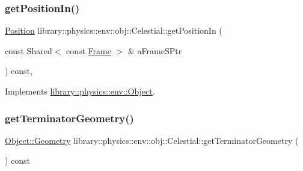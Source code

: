 \mbox{\label{classlibrary_1_1physics_1_1env_1_1obj_1_1_celestial_aa2a209f37414e24303c21d994396664f}} 
\subsubsection{\texorpdfstring{get\+Position\+In()}{getPositionIn()}}
{\footnotesize\ttfamily \hyperlink{classlibrary_1_1physics_1_1coord_1_1_position}{Position} library\+::physics\+::env\+::obj\+::\+Celestial\+::get\+Position\+In (\begin{DoxyParamCaption}\item[{const Shared$<$ const \hyperlink{classlibrary_1_1physics_1_1coord_1_1_frame}{Frame} $>$ \&}]{a\+Frame\+S\+Ptr }\end{DoxyParamCaption}) const\hspace{0.3cm}{\ttfamily [override]}, {\ttfamily [virtual]}}



Implements \hyperlink{classlibrary_1_1physics_1_1env_1_1_object_acc86d12ad94de870fc2684f7b768b617}{library\+::physics\+::env\+::\+Object}.

\mbox{\label{classlibrary_1_1physics_1_1env_1_1obj_1_1_celestial_aa910ed14605693ee5af68d88015cd53b}} 
\subsubsection{\texorpdfstring{get\+Terminator\+Geometry()}{getTerminatorGeometry()}}
{\footnotesize\ttfamily \hyperlink{classlibrary_1_1physics_1_1env_1_1_object_abdf50733c7ad97327fb64edca5670f13}{Object\+::\+Geometry} library\+::physics\+::env\+::obj\+::\+Celestial\+::get\+Terminator\+Geometry (\begin{DoxyParamCaption}{ }\end{DoxyParamCaption}) const}

